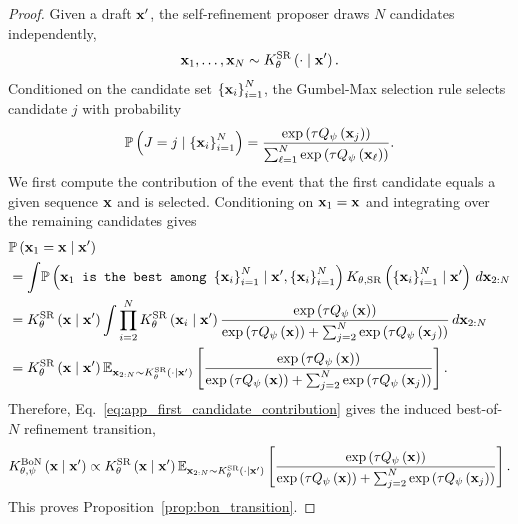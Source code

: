 \begin{proof}
Given a draft $\mathbf{x}'$, the self-refinement proposer draws $N$ candidates independently,
\begin{equation*}
    \mathbf{x}_1,\ldots,\mathbf{x}_N
    \sim
    K_{\theta}^{\mathrm{SR}}\left(\cdot\mid\mathbf{x}'\right).
\end{equation*}
Conditioned on the candidate set $\left\{\mathbf{x}_i\right\}_{i=1}^{N}$, the Gumbel-Max selection rule selects candidate $j$ with probability
\begin{equation*}
    \mathbb{P}\left(
        J=j
        \mid
        \left\{\mathbf{x}_i\right\}_{i=1}^{N}
    \right)
    =
    \frac{
        \exp\left(\tau Q_\psi\left(\mathbf{x}_j\right)\right)
    }{
        \sum_{\ell=1}^{N}
        \exp\left(\tau Q_\psi\left(\mathbf{x}_\ell\right)\right)
    }.
    \label{eq:app_bon_selection_prob}
\end{equation*}
We first compute the contribution of the event that the first candidate equals a given sequence $\mathbf{x}$ and is selected. 
Conditioning on $\mathbf{x}_1=\mathbf{x}$ and integrating over the remaining candidates gives
\begin{equation}
\begin{aligned}
    &
    \PP\rbr{
        \dv_1=\dv %
        \mid
        \dv'
    }
    \\
    &=
    { \int} \PP\rbr{\texttt{$\xb_1$ is the best among $\cbr{\dv_i}_{i=1}^N$}\mid \xb',\cbr{\dv_i}_{i=1}^N} K_{\theta,\mathrm{SR}}\rbr{\cbr{\dv_i}_{i=1}^N\mid\xb'} \,d\dv_{2:N}\\
    &=
    K_{\theta}^{\mathrm{SR}}\rbr{\dv\mid\dv'}
    {\int}
    \prod_{i=2}^{N}
    K_{\theta}^{\mathrm{SR}}\rbr{\dv_i\mid\dv'}
    \frac{
        \exp\rbr{\tau\scorer\rbr{\dv}}
    }{
        \exp\rbr{\tau\scorer\rbr{\dv}}
        +
        \sum_{j=2}^{N}
        \exp\rbr{\tau\scorer\rbr{\dv_j}}
    }
    \,d\dv_{2:N}
    \\
    &=
    K_{\theta}^{\mathrm{SR}}\rbr{\dv\mid\dv'}
    \EE_{\dv_{2:N}\sim K_{\theta}^{\mathrm{SR}}\rbr{\cdot\mid\dv'}}
    \sbr{
        \frac{
            \exp\rbr{\tau\scorer\rbr{\dv}}
        }{
            \exp\rbr{\tau\scorer\rbr{\dv}}
            +
            \sum_{j=2}^{N}
            \exp\rbr{\tau\scorer\rbr{\dv_j}}
        }
    }.
\end{aligned}
\label{eq:app_first_candidate_contribution}
\end{equation}
Therefore, Eq.~\eqref{eq:app_first_candidate_contribution} gives the induced best-of-$N$ refinement transition,
\begin{equation}
\begin{aligned}
    K_{\theta,\psi}^{\mathrm{BoN}}\left(\mathbf{x}\mid\mathbf{x}'\right)
    \propto K_{\theta}^{\mathrm{SR}}\left(\mathbf{x}\mid\mathbf{x}'\right)
    \mathbb{E}_{\mathbf{x}_{2:N}\sim K_{\theta}^{\mathrm{SR}}\left(\cdot\mid\mathbf{x}'\right)}
    \left[
        \frac{
            \exp\left(\tau Q_\psi\left(\mathbf{x}\right)\right)
        }{
            \exp\left(\tau Q_\psi\left(\mathbf{x}\right)\right)
            +
            \sum_{j=2}^{N}
            \exp\left(\tau Q_\psi\left(\mathbf{x}_j\right)\right)
        }
    \right].
\end{aligned}
\end{equation}
This proves Proposition~\ref{prop:bon_transition}.
\end{proof}

